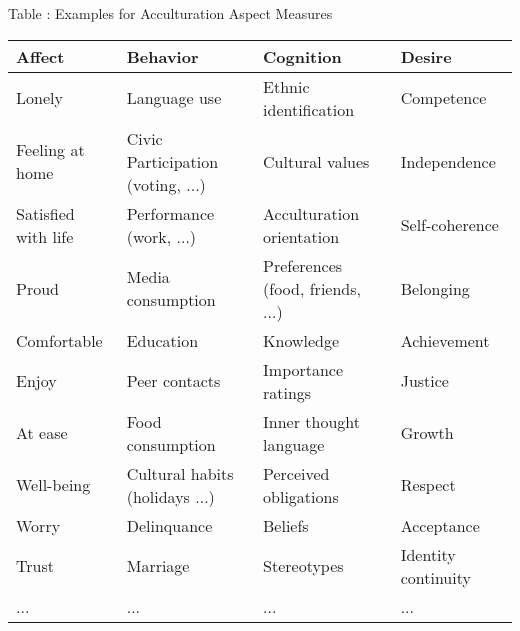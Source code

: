 \begin{table}[hbt!]
\label{tab:Examples}
\smallskip\noindent\small Table \thetable: Examples for Acculturation Aspect Measures \\ 
\begin{tabular}{@{}llll@{}}
\toprule
Affect              & Behavior                                     & Cognition                          & Desire                \\ \midrule
Lonely              & Language   use                               & Ethnic   identification            & Competence            \\
Feeling at home     & Civic   Participation (voting, ...)          & Cultural   values                  & Independence          \\
Satisfied with life & Performance   (work, ...)                    & Acculturation   orientation        & Self-coherence        \\
Proud               & Media   consumption                          & Preferences   (food, friends, ...) & Belonging             \\
Comfortable         & Education                                    & Knowledge                          & Achievement           \\
Enjoy               & Peer   contacts                              & Importance   ratings               & Justice               \\
At ease             & Food   consumption                           & Inner   thought language           & Growth                \\
Well-being          & Cultural   habits (holidays ...) & Perceived   obligations            & Respect               \\
Worry               & Delinquance                                  & Beliefs                            & Acceptance            \\
Trust               & Marriage                                     & Stereotypes                        & Identity   continuity \\
...                 & ...                                          & ...                                & ...                   \\ \bottomrule
\end{tabular}
\end{table}